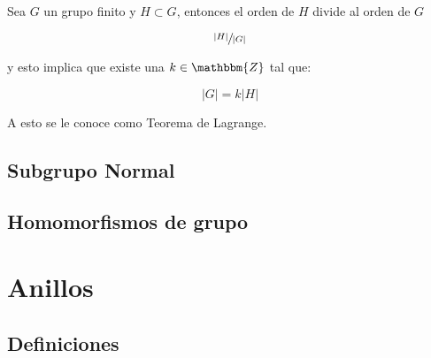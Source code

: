         \begin{teorema}
            Sea $G$ un grupo finito y $H \subset G$, entonces el orden de $H$ divide al orden de $G$

            \begin{equation}
                \sfrac{|H|}{|G|}
            \end{equation}

            y esto implica que existe una $k \in \mathbbm{Z}$ tal que:

            \begin{equation}
                |G| = k |H|
            \end{equation}

            A esto se le conoce como Teorema de Lagrange.
        \end{teorema}


    \subsection{Subgrupo Normal}



    \subsection{Homomorfismos de grupo}



\newpage
\section{Anillos}


    \subsection{Definiciones}


